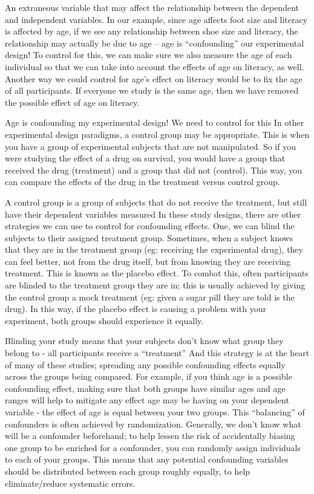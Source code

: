 \documentclass[
]{book}
\begin{document}
An extraneous variable that may affect the relationship between the dependent and independent variables.
In our example, since age affects foot size and literacy is affected by age, if we see any relationship between shoe size and literacy, the relationship may actually be due to age -- age is ``confounding'' our experimental design!
To control for this, we can make sure we also measure the age of each individual so that we can take into account the effects of age on literacy, as well. Another way we could control for age's effect on literacy would be to fix the age of all participants. If everyone we study is the same age, then we have removed the possible effect of age on literacy.

Age is confounding my experimental design! We need to control for this
In other experimental design paradigms, a control group may be appropriate. This is when you have a group of experimental subjects that are not manipulated. So if you were studying the effect of a drug on survival, you would have a group that received the drug (treatment) and a group that did not (control). This way, you can compare the effects of the drug in the treatment versus control group.

A control group is a group of subjects that do not receive the treatment, but still have their dependent variables measured
In these study designs, there are other strategies we can use to control for confounding effects. One, we can blind the subjects to their assigned treatment group. Sometimes, when a subject knows that they are in the treatment group (eg: receiving the experimental drug), they can feel better, not from the drug itself, but from knowing they are receiving treatment. This is known as the placebo effect. To combat this, often participants are blinded to the treatment group they are in; this is usually achieved by giving the control group a mock treatment (eg: given a sugar pill they are told is the drug). In this way, if the placebo effect is causing a problem with your experiment, both groups should experience it equally.

Blinding your study means that your subjects don't know what group they belong to - all participants receive a ``treatment''
And this strategy is at the heart of many of these studies; spreading any possible confounding effects equally across the groups being compared. For example, if you think age is a possible confounding effect, making sure that both groups have similar ages and age ranges will help to mitigate any effect age may be having on your dependent variable - the effect of age is equal between your two groups.
This ``balancing'' of confounders is often achieved by randomization. Generally, we don't know what will be a confounder beforehand; to help lessen the risk of accidentally biasing one group to be enriched for a confounder, you can randomly assign individuals to each of your groups. This means that any potential confounding variables should be distributed between each group roughly equally, to help eliminate/reduce systematic errors.
\end{document}
